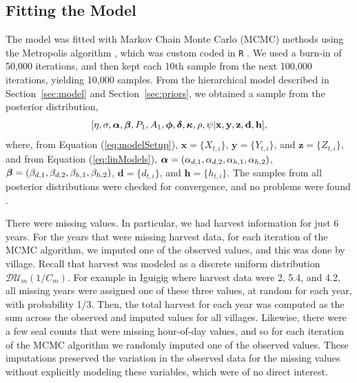 \documentclass[]{risa}\usepackage[]{graphicx}\usepackage[]{color}
\newcommand{\bx}{\ensuremath{\mathbf{x}}}
\newcommand{\bz}{\ensuremath{\mathbf{z}}}
\def\bd{\mathbf{d}}
\def\bh{\mathbf{h}}
\def\bx{\mathbf{x}}
\def\by{\mathbf{y}}
\def\bz{\mathbf{z}}
\def\balpha{\mbox{\boldmath $\alpha$}}
\def\bbeta{\mbox{\boldmath $\beta$}}
\def\bdelta{\mbox{\boldmath $\delta$}}
\def\bphi{\mbox{\boldmath $\phi$}}
\def\bkappa{\mbox{\boldmath $\kappa$}}
\begin{document}

\subsection{Fitting the Model}

The model was fitted with Markov Chain Monte Carlo (MCMC) methods using the Metropolis algorithm \citep{Metr:Rose:Rose:Tell:Tell:equa:1953}, which was custom coded in \texttt{R} \citep{R:Deve:Core:ALan:2016}. We used a burn-in of 50,000 iterations, and then kept each 10th sample from the next 100,000 iterations, yielding 10,000 samples.  From the hierarchical model described in Section~\ref{sec:model} and Section~\ref{sec:priors}, we obtained a sample from the posterior distribution,
%
\[
[\eta, \sigma, \balpha, \bbeta, P_1, A_1, \bphi, \bdelta, \bkappa, \rho, \psi | \bx, \by, \bz, \bd, \bh],
\]
where, from Equation (\ref{eq:modelSetup}), $\bx = \{X_{t,i}\}$, $\by = \{Y_{t,i}\}$, and $\bz = \{Z_{t,i}\}$, and from Equation (\ref{eq:linModels}), $\balpha = (\alpha_{d,1}, \alpha_{d,2}, \alpha_{h,1}, \alpha_{h,2})$, $\bbeta = (\beta_{d,1}, \beta_{d,2}, \beta_{h,1}, \beta_{h,2})$, $\bd = \{d_{t,i}\}$, and $\bh = \{h_{t,i}\}$.  The samples from all posterior distributions were checked for convergence, and no problems were found \citep{Jone:Hara:Caff:Neat:fixe:2006}.

There were missing values.  In particular, we had harvest information for just 6 years.  For the years that were missing harvest data, for each iteration of the MCMC algorithm, we imputed one of the observed values, and this was done by village.  Recall that harvest was modeled as a discrete uniform distribution $\mathcal{DU}_m(1/C_m)$. For example in Iguigig where harvest data were 2, 5.4, and 4.2, all missing years were assigned one of these three values, at random for each year, with probability 1/3.  Then, the total harvest for each year was computed as the sum across the observed and imputed values for all villages. Likewise, there were a few seal counts that were missing hour-of-day values, and so for each iteration of the MCMC algorithm we randomly imputed one of the observed values.  These imputations preserved the variation in the observed data for the missing values without explicitly modeling these variables, which were of no direct interest.
\end{document}
